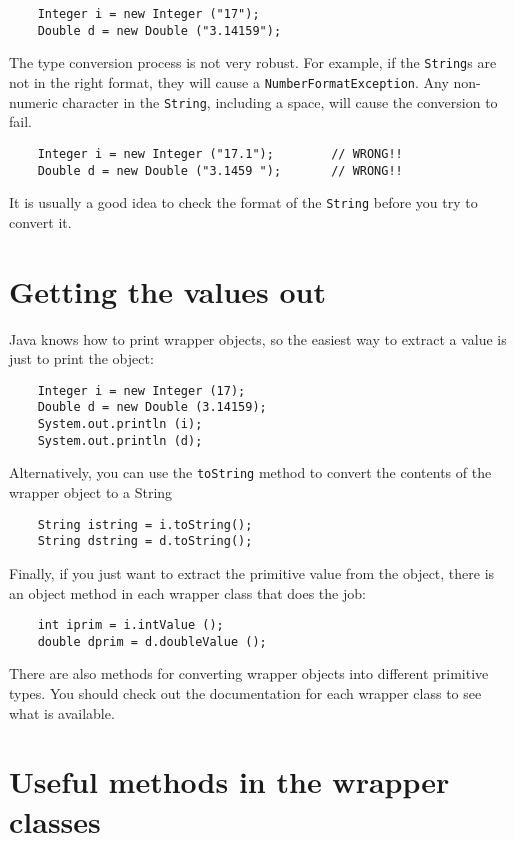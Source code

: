 \begin{verbatim}
    Integer i = new Integer ("17");
    Double d = new Double ("3.14159");
\end{verbatim}
%
The type conversion process is not very robust.
For example, if the {\tt String}s are not in the right format,
they will cause a {\tt NumberFormatException}.  Any non-numeric
character in the {\tt String}, including a space, will cause
the conversion to fail.


\begin{verbatim}
    Integer i = new Integer ("17.1");        // WRONG!!
    Double d = new Double ("3.1459 ");       // WRONG!!
\end{verbatim}
%
It is usually a good idea to check the format of the {\tt String}
before you try to convert it.


\section{Getting the values out}

Java knows how to print wrapper objects, so the easiest
way to extract a value is just to print the object:

\begin{verbatim}
    Integer i = new Integer (17);
    Double d = new Double (3.14159);
    System.out.println (i);
    System.out.println (d);
\end{verbatim}
%
Alternatively, you can use the {\tt toString} method to
convert the contents of the wrapper object to a String

\begin{verbatim}
    String istring = i.toString();
    String dstring = d.toString();
\end{verbatim}
%
Finally, if you just want to extract the primitive value
from the object, there is an object method in each wrapper
class that does the job:

\begin{verbatim}
    int iprim = i.intValue ();
    double dprim = d.doubleValue ();
\end{verbatim}
%
There are also methods for converting wrapper objects into
different primitive types.  You should check out the documentation
for each wrapper class to see what is available.


\section{Useful methods in the wrapper classes}

